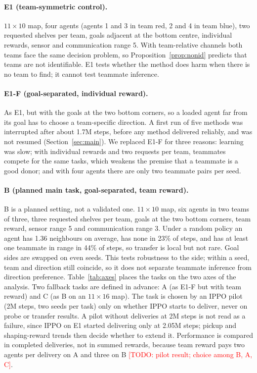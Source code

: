 \documentclass{article}
\theoremstyle{remark}
\newcommand{\todo}[1]{\textcolor{red}{[TODO: #1]}}
\begin{document}
\paragraph{E1 (team-symmetric control).} $11\times10$ map, four agents (agents 1 and 3 in team red, 2 and 4 in team blue),
two requested shelves per team, goals adjacent at the bottom centre, individual rewards, sensor and communication range 5.
With team-relative channels both teams face the same decision problem, so Proposition~\ref{prop:nonid} predicts that
teams are not identifiable. E1 tests whether the method does harm when there is no team to find; it cannot test teammate
inference.

\paragraph{E1-F (goal-separated, individual reward).} As E1, but with the goals at the two bottom corners, so a loaded agent
far from its goal has to choose a team-specific direction. A first run of five methods was interrupted after about 1.7M
steps, before any method delivered reliably, and was not resumed (Section~\ref{sec:main}). We replaced E1-F for three reasons:
learning was slow; with individual rewards and two requests per team, teammates compete for the same tasks, which weakens the
premise that a teammate is a good donor; and with four agents there are only two teammate pairs per seed.

\paragraph{B (planned main task, goal-separated, team reward).} B is a planned setting, not a validated one. $11\times10$ map, six agents in two teams of three, three requested
shelves per team, goals at the two bottom corners, team reward, sensor range 5 and communication range 3. Under a random
policy an agent has 1.36 neighbours on average, has none in 23\% of steps, and has at least one teammate in range in 44\% of
steps, so transfer is local but not rare. Goal sides are swapped on even seeds. This tests robustness to the side; within a
seed, team and direction still coincide, so it does not separate teammate inference from direction preference.
Table~\ref{tab:axes} places the tasks on the two axes of the analysis. Two fallback
tasks are defined in advance: A (as E1-F but with team reward) and C (as B on an $11\times16$ map). The task is chosen by an
IPPO pilot (2M steps, two seeds per task) only on whether IPPO starts to deliver, never on probe or transfer results. A pilot
without deliveries at 2M steps is not read as a failure, since IPPO on E1 started delivering only at 2.05M steps; pickup and
shaping-reward trends then decide whether to extend it. Performance is compared in completed deliveries, not in summed
rewards, because team reward pays two agents per delivery on A and three on B \todo{pilot result; choice among B, A, C}.
\end{document}
